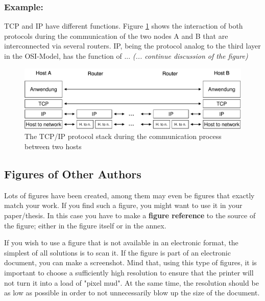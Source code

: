     \begin{example}
      \subsubsection*{Example:}
      TCP and IP have different functions. Figure \ref{fig:1} shows the
      interaction of both protocols during the communication of the two
      nodes A and B that are interconnected via several routers. IP, being
      the protocol analog to the third layer in the OSI-Model, has the
      function of ... \emph{(... continue discussion of the figure)}
     \end{example}

  \begin{figure}[ht]
    \begin{center}
      \includegraphics[width=\textwidth]{fig/communication}
      \caption{The TCP/IP protocol stack during the communication process
        between two hosts}
      \label{fig:1}
    \end{center}
  \end{figure}



\subsection{Figures of Other Authors}
Lots of figures have been created, among them may even be figures that
exactly match your work. If you find such a figure, you might want to use
it in your paper/thesis. In this case you have to make a \textbf{figure reference} to the source of the figure; either in the figure itself or in the annex.

If you wish to use a figure that is not available in an electronic format,
the simplest of all solutions is to scan it. If the figure is part of an
electronic document, you can make a screenshot. Mind that, using this type
of figures, it is important to choose a sufficiently high resolution to ensure that the printer will not turn it into a load of "pixel mud".
At the same time, the resolution should be as low as possible in order to not
unnecessarily blow up the size of the document.

